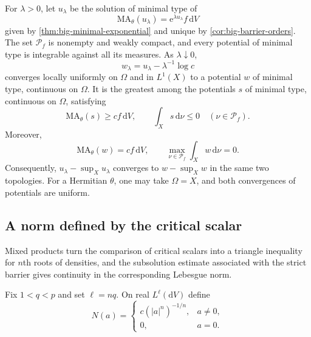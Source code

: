 \begin{theorem}\label{thm:vanishing-exponential-selection}
For $\lambda>0$, let $u_\lambda$ be the solution of minimal type of
\[
 \mathrm{MA}_\theta(u_\lambda)
       =\mathrm{e}^{\lambda u_\lambda}f\,\mathrm{d}V
\]
given by \cref{thm:big-minimal-exponential} and unique by \cref{cor:big-barrier-orders}. The set $\mathcal P_f$ is nonempty and weakly compact, and every potential of minimal type is integrable against all its measures. As $\lambda\downarrow0$,
\[
 w_\lambda=u_\lambda-\lambda^{-1}\log c
\]
converges locally uniformly on $\Omega$ and in $L^1(X)$ to a potential $w$ of minimal type, continuous on $\Omega$. It is the greatest among the potentials $s$ of minimal type, continuous on $\Omega$, satisfying
\begin{equation}\label{eq:selection-class}
 \mathrm{MA}_\theta(s)\geq cf\,\mathrm{d}V,\qquad
 \int_Xs\,\mathrm{d}\nu\leq0\quad(\nu\in\mathcal P_f).
\end{equation}
Moreover,
\[
 \mathrm{MA}_\theta(w)=cf\,\mathrm{d}V,\qquad
 \max_{\nu\in\mathcal P_f}\int_Xw\,\mathrm{d}\nu=0.
\]
Consequently, $u_\lambda-\sup_Xu_\lambda$ converges to $w-\sup_Xw$ in the same two topologies. For a Hermitian $\theta$, one may take $\Omega=X$, and both convergences of potentials are uniform.
\end{theorem}

\subsection{A norm defined by the critical scalar}

Mixed products turn the comparison of critical scalars into a triangle inequality for $n$th roots of densities, and the subsolution estimate associated with the strict barrier gives continuity in the corresponding Lebesgue norm.

Fix $1<q<p$ and set $\ell=nq$. On real $L^\ell(\mathrm{d}V)$ define
\[
 N(a)=
 \begin{cases}
 c(|a|^n)^{-1/n},&a\ne0,\\
 0,&a=0.
 \end{cases}
\]

